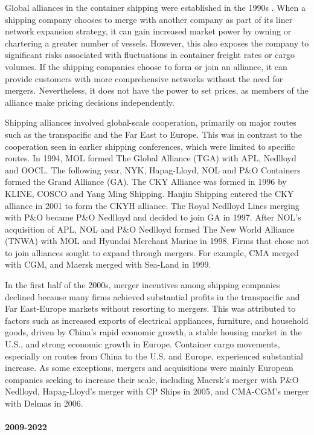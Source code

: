 \documentclass[10pt]{article}
\begin{document}
Global alliances in the container shipping were established in the 1990s \citep{Hirata2017}. 
When a shipping company chooses to merge with another company as part of its liner network expansion strategy, it can gain increased market power by owning or chartering a greater number of vessels. However, this also exposes the company to significant risks associated with fluctuations in container freight rates or cargo volumes. If the shipping companies choose to form or join an alliance, it can provide customers with more comprehensive networks without the need for mergers. Nevertheless, it does not have the power to set prices, as members of the alliance make pricing decisions independently.

Shipping alliances involved global-scale cooperation, primarily on major routes such as the transpacific and the Far East to Europe. 
This was in contrast to the cooperation seen in earlier shipping conferences, which were limited to specific routes.
In 1994, MOL formed The Global Alliance (TGA) with APL, Nedlloyd and OOCL.
The following year, NYK, Hapag-Lloyd, NOL and P\&O Containers formed the Grand Alliance (GA).
The CKY Alliance was formed in 1996 by KLINE, COSCO and Yang Ming Shipping. 
Hanjin Shipping entered the CKY alliance in 2001 to form the CKYH alliance.
The Royal Nedlloyd Lines merging with P\&O became P\&O Nedlloyd and decided to join GA in 1997.
After NOL's acquisition of APL, NOL and P\&O Nedlloyd formed The New World Alliance (TNWA) with MOL and Hyundai Merchant Marine in 1998.
Firms that chose not to join alliances sought to expand through mergers. For example, CMA merged with CGM, and Maersk merged with Sea-Land in 1999.

In the first half of the 2000s, merger incentives among shipping companies declined because many firms achieved substantial profits in the transpacific and Far East-Europe markets without resorting to mergers. This was attributed to factors such as increased exports of electrical appliances, furniture, and household goods, driven by China's rapid economic growth, a stable housing market in the U.S., and strong economic growth in Europe. 
Container cargo movements, especially on routes from China to the U.S. and Europe, experienced substantial increase.
As some exceptions, mergers and acquisitions were mainly European companies seeking to increase their scale, including Maersk's merger with P\&O Nedlloyd, Hapag-Lloyd's merger with CP Ships in 2005, and CMA-CGM's merger with Delmas in 2006.


\paragraph{2009-2022}
\end{document}
